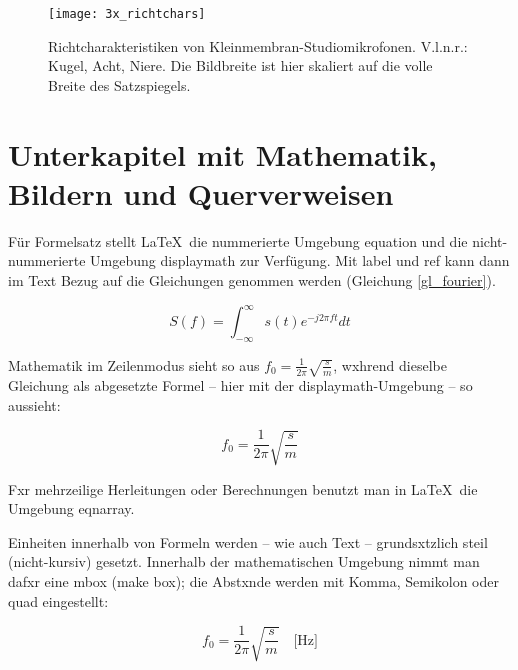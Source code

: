             \begin{figure}[htp]     %
                \centering
                \texttt{[image: 3x\_richtchars]}
                \caption[Richtcharakteristiken von Kleinmembran-Studiomikrofonen]{Richtcharakteristiken von Kleinmembran-Studiomikrofonen. V.l.n.r.: Kugel, Acht, Niere. Die Bildbreite ist hier skaliert auf die volle Breite des Satzspiegels.}\label{richtch}
                \end{figure}

        \section{Unterkapitel mit Mathematik, Bildern und Querverweisen}

            Für Formelsatz stellt \LaTeX\ die nummerierte Umgebung equation und die nicht-nummerierte Umgebung displaymath zur Verfügung. Mit label und ref kann dann im Text Bezug auf die Gleichungen genommen werden (Gleichung \ref{gl_fourier}). 

            \begin{equation}\label{gl_fourier}
            S(f) = \int_{-\infty}^{\infty} s(t)e^{-j 2 \pi f t}dt
            \end{equation}

            Mathematik im Zeilenmodus sieht so aus $f_0 = \frac{1}{2\pi} \sqrt{\frac{s}{m}}$, wxhrend dieselbe Gleichung als abgesetzte Formel -- hier mit der displaymath-Umgebung -- so aussieht: 

            \begin{displaymath}
            f_0 = \frac{1}{2\pi} \sqrt{\frac{s}{m}} 
            \end{displaymath}

            Fxr mehrzeilige Herleitungen oder Berechnungen benutzt man in \LaTeX\ die Umgebung eqnarray.

            Einheiten innerhalb von Formeln werden -- wie auch Text -- grundsxtzlich steil (nicht-kursiv) gesetzt. Innerhalb der mathematischen Umgebung nimmt man dafxr eine mbox (make box); die Abstxnde werden mit Komma, Semikolon oder quad eingestellt:

            \begin{displaymath}
            f_0 = \frac{1}{2\pi} \sqrt{\frac{s}{m}} \quad \mbox{[Hz]}
            \end{displaymath}

